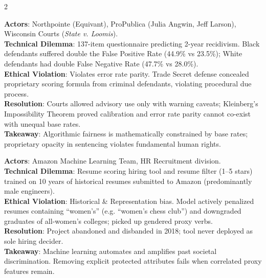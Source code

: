\documentclass[9pt,a4paper]{extarticle}
\begin{document}
\begin{multicols}{2}
\begin{tcolorbox}[casebox,title={5. COMPAS Recidivism Algorithm (2016)}]
\textbf{Actors}: Northpointe (Equivant), ProPublica (Julia Angwin, Jeff Larson), Wisconsin Courts (\textit{State v. Loomis}).\\
\textbf{Technical Dilemma}: 137-item questionnaire predicting 2-year recidivism. Black defendants suffered double the False Positive Rate (44.9\% vs 23.5\%); White defendants had double False Negative Rate (47.7\% vs 28.0\%).\\
\textbf{Ethical Violation}: Violates error rate parity. Trade Secret defense concealed proprietary scoring formula from criminal defendants, violating procedural due process.\\
\textbf{Resolution}: Courts allowed advisory use only with warning caveats; Kleinberg's Impossibility Theorem proved calibration and error rate parity cannot co-exist with unequal base rates.\\
\textbf{Takeaway}: Algorithmic fairness is mathematically constrained by base rates; proprietary opacity in sentencing violates fundamental human rights.
\end{tcolorbox}

\begin{tcolorbox}[casebox,title={6. Amazon AI Recruitment Tool (2014--2018)}]
\textbf{Actors}: Amazon Machine Learning Team, HR Recruitment division.\\
\textbf{Technical Dilemma}: Resume scoring hiring tool and resume filter (1--5 stars) trained on 10 years of historical resumes submitted to Amazon (predominantly male engineers).\\
\textbf{Ethical Violation}: Historical \& Representation bias. Model actively penalized resumes containing ``women's'' (e.g. ``women's chess club'') and downgraded graduates of all-women's colleges; picked up gendered proxy verbs.\\
\textbf{Resolution}: Project abandoned and disbanded in 2018; tool never deployed as sole hiring decider.\\
\textbf{Takeaway}: Machine learning automates and amplifies past societal discrimination. Removing explicit protected attributes fails when correlated proxy features remain.
\end{tcolorbox}


\end{multicols}
\end{document}
